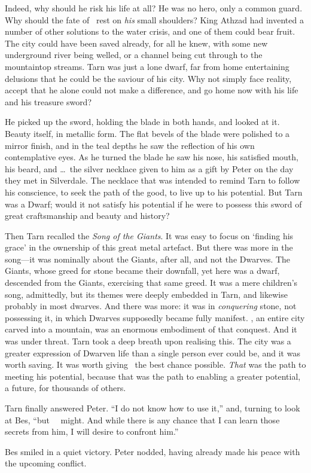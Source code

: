 Indeed, why should he risk his life at all?  He was no hero, only a common guard.  Why should the fate of \korbarthrond\ rest on \emph{his} small shoulders?  King Athzad had invented a number of other solutions to the water crisis, and one of them could bear fruit.  The city could have been saved already, for all he knew, with some new underground river being welled, or a channel being cut through to the mountaintop streams.  Tarn was just a lone dwarf, far from home entertaining delusions that he could be the saviour of his city.  Why not simply face reality, accept that he alone could not make a difference, and go home now with his life and his treasure sword?

He picked up the sword, holding the blade in both hands, and looked at it.  Beauty itself, in metallic form.  The flat bevels of the blade were polished to a mirror finish, and in the teal depths he saw the reflection of his own contemplative eyes.  As he turned the blade he saw his nose, his satisfied mouth, his beard, and \ldots\ the silver necklace given to him as a gift by Peter on the day they met in Silverdale.  The necklace that was intended to remind Tarn to follow his conscience, to seek the path of the good, to live up to his potential.  But Tarn was a Dwarf; would it not satisfy his potential  if he were to possess this sword of great craftsmanship and beauty and history?

Then Tarn recalled the \emph{Song of the Giants}.  It was easy to focus on `finding his grace' in the ownership of this great metal artefact.  But there was more in the song---it was nominally about the Giants, after all, and not the Dwarves.  The Giants, whose greed for stone became their downfall, yet here was a dwarf, descended from the Giants, exercising that same greed.  It was a mere children's song, admittedly, but its themes were deeply embedded in Tarn, and likewise probably in most dwarves.  And there was more: it was in \emph{conquering} stone, not possessing it, in which Dwarves supposedly became fully manifest.  \korbarthrond, an entire city carved into a mountain, was an enormous embodiment of that conquest.  And it was under threat.  Tarn took a deep breath upon realising this.  The city was a greater expression of Dwarven life than a single person ever could be, and it was worth saving.  It was worth giving \korbarthrond\ the best chance possible.  \emph{That} was the path to meeting his potential, because that was the path to enabling a greater potential, a future, for thousands of others.

Tarn finally answered Peter.  ``I do not know how to use it,''  and, turning to look at Bes, ``but \mothzam\ \driktur\ might.  And while there is any chance that I can learn those secrets from him, I will desire to confront him.''

Bes smiled in a quiet victory.  Peter nodded, having already made his peace with the upcoming conflict.  





